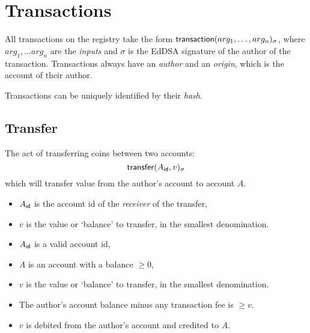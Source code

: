 \section{Transactions}
\label{s:transactions}

All transactions on the registry take the form $\mathsf{transaction}\lparen arg_1, \ldots,
arg_n\rparen_\sigma$, where $arg_1, \ldots arg_n$ are the \emph{inputs} and $\sigma$ is the
\textsf{EdDSA} signature of the author of the transaction. Transactions
always have an \emph{author} and an \emph{origin}, which is the account of
their author.

Transactions can be uniquely identified by their \emph{hash}.

\subsection{Transfer}
The act of transferring coins between two accounts:
\[
    \mathsf{transfer}\lparen A_{\mathsf{id}}, v\rparen_\sigma
\]
which will transfer value from the author's account to account $A$.

\begin{itemize}
    \item $A_{\mathsf{id}}$ is the account id of the \emph{receiver} of the transfer,
    \item $v$ is the value or `balance' to transfer, in the smallest denomination.
\end{itemize}
\validation
\begin{itemize}
    \item $A_{\mathsf{id}}$ is a valid account id,
    \item $A$ is an account with a balance $\geq 0$,
    \item $v$ is the value or `balance' to transfer, in the smallest denomination.
    \item The author's account balance minus any transaction fee is $\geq v$.
\end{itemize}
\outputs
\begin{itemize}
    \item $v$ is debited from the author's account and credited to $A$.
\end{itemize}

